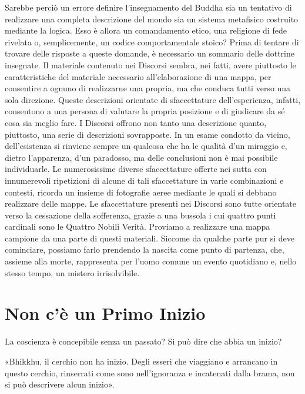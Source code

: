 
 Sarebbe perciò un errore definire l’insegnamento del
Buddha sia un tentativo di realizzare una completa descrizione del mondo sia un
sistema metafisico costruito mediante la logica. Esso è allora un comandamento
etico, una religione di fede rivelata o, semplicemente, un codice
comportamentale stoico? Prima di tentare di trovare delle risposte a queste
domande, è necessario un sommario delle dottrine insegnate. Il materiale
contenuto nei Discorsi sembra, nei fatti, avere piuttosto le caratteristiche del
materiale necessario all’elaborazione di una mappa, per consentire a ognuno di
realizzarne una propria, ma che conduca tutti verso una sola direzione. Queste
descrizioni orientate di sfaccettature dell’esperienza, infatti, consentono a
una persona di valutare la propria posizione e di giudicare da sé cosa sia
meglio fare. I Discorsi offrono non tanto una descrizione quanto, piuttosto, una
serie di descrizioni sovrapposte. In un esame condotto da vicino, dell’esistenza
si rinviene sempre un qualcosa che ha le qualità d’un miraggio e, dietro
l’apparenza, d’un paradosso, ma delle conclusioni non è mai possibile
individuarle. Le numerosissime diverse sfaccettature offerte nei sutta con
innumerevoli ripetizioni di alcune di tali sfaccettature in varie combinazioni e
contesti, ricorda un insieme di fotografie aeree mediante le quali si debbano
realizzare delle mappe. Le sfaccettature presenti nei Discorsi sono tutte
orientate verso la cessazione della sofferenza, grazie a una bussola i cui
quattro punti cardinali sono le Quattro Nobili Verità. Proviamo a realizzare una
mappa campione da una parte di questi materiali. Siccome da qualche parte pur si
deve cominciare, possiamo farlo prendendo la nascita come punto di partenza,
che, assieme alla morte, rappresenta per l’uomo comune un evento quotidiano e,
nello stesso tempo, un mistero irrisolvibile.

\section*{Non c’è un Primo Inizio}

 La coscienza è concepibile senza un passato? Si
può dire che abbia un inizio?

 «Bhikkhu, il cerchio non ha inizio. Degli esseri che
viaggiano e arrancano in questo cerchio, rinserrati come sono nell’ignoranza e
incatenati dalla brama, non si può descrivere alcun inizio».

